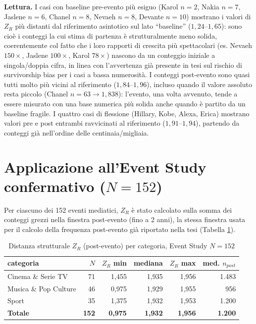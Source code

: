 \documentclass[conference]{IEEEtran}
\begin{document}
\textbf{Lettura.} I casi con baseline pre-evento più esiguo (Karol $n=2$, Nakia $n=7$, Jaslene
$n=6$, Chanel $n=8$, Nevaeh $n=8$, Devante $n=10$) mostrano i valori di $Z_R$ più distanti dal
riferimento asintotico sul lato ``baseline'' ($1{,}24$--$1{,}65$): sono cioè i conteggi la
cui stima di partenza è strutturalmente meno solida, coerentemente col fatto che i loro
rapporti di crescita più spettacolari (es. Nevaeh $150\times$, Jaslene $100\times$, Karol
$78\times$) nascono da un conteggio iniziale a singola/doppia cifra, in linea con l'avvertenza
già presente in tesi sul rischio di survivorship bias per i casi a bassa numerosità. I conteggi
post-evento
sono quasi tutti molto più vicini al riferimento ($1{,}84$--$1{,}96$), incluso quando il
valore assoluto resta piccolo (Chanel $n=63 \to 1{,}838$): l'evento, una volta avvenuto, tende
a essere misurato con una base numerica più solida anche quando è partito da un baseline
fragile. I quattro casi di flessione (Hillary, Kobe, Alexa, Erica) mostrano valori pre e post
entrambi ravvicinati al riferimento ($1{,}91$--$1{,}94$), partendo da conteggi già
nell'ordine delle centinaia/migliaia.

\section{Applicazione all'Event Study confermativo ($N=152$)}

Per ciascuno dei 152 eventi mediatici, $Z_R$ è stato calcolato sulla somma dei conteggi
grezzi nella finestra post-evento (fino a 2 anni), la stessa finestra usata per il calcolo
della frequenza post-evento già riportato nella tesi (Tabella \ref{tab:eventstudy}).

\begin{table}[t]
\centering
\footnotesize
\caption{Distanza strutturale $Z_R$ (post-evento) per categoria, Event Study $N=152$}
\label{tab:eventstudy}
\begin{tabular}{l r r r r r}
\toprule
\textbf{categoria} & \textbf{$N$} & \textbf{$Z_R$ min} & \textbf{mediana} & \textbf{$Z_R$ max} & \textbf{med. $n_{post}$} \\
\midrule
Cinema \& Serie TV      & 71  & 1,455 & 1,935 & 1,956 & 1.483 \\
Musica \& Pop Culture   & 46  & 0,975 & 1,929 & 1,955 & 956   \\
Sport                   & 35  & 1,375 & 1,932 & 1,953 & 1.200 \\
\midrule
\textbf{Totale}         & \textbf{152} & \textbf{0,975} & \textbf{1,932} & \textbf{1,956} & \textbf{1.200} \\
\bottomrule
\end{tabular}
\end{table}
\end{document}
